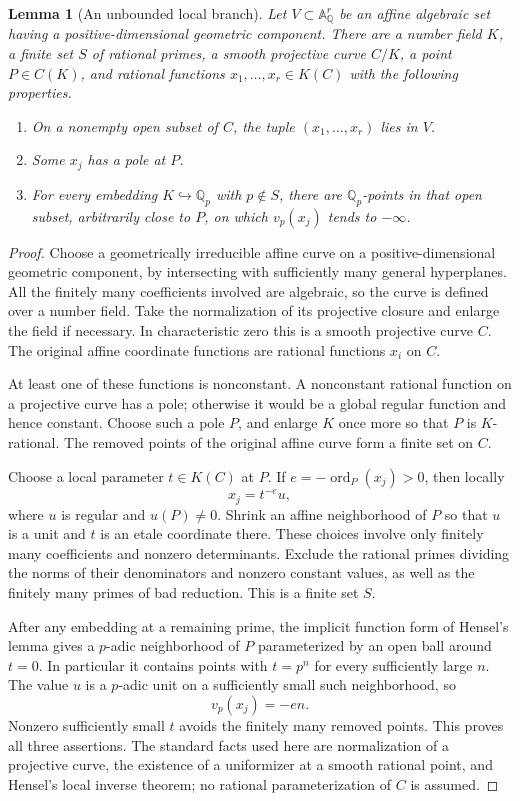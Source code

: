\documentclass[11pt]{article}
\newtheorem{lemma}[theorem]{Lemma}
\newcommand{\Q}{\mathbb Q}\newcommand{\Z}{\mathbb Z}
\begin{document}
\begin{lemma}[An unbounded local branch]\label{branch}
Let $V\subset\mathbb A^r_{\Q}$ be an affine algebraic set having a
positive-dimensional geometric component. There are a number field $K$,
a finite set $S$ of rational primes, a smooth projective curve $C/K$,
a point $P\in C(K)$, and rational functions $x_1,\ldots,x_r\in K(C)$
with the following properties.
\begin{enumerate}
\item On a nonempty open subset of $C$, the tuple $(x_1,\ldots,x_r)$ lies
in $V$.
\item Some $x_j$ has a pole at $P$.
\item For every embedding $K\hookrightarrow\Q_p$ with $p\notin S$,
there are $\Q_p$-points in that open subset, arbitrarily close to $P$,
on which $v_p(x_j)$ tends to $-\infty$.
\end{enumerate}
\end{lemma}
\begin{proof}
Choose a geometrically irreducible affine curve on a positive-dimensional
geometric component,
by intersecting with sufficiently many general hyperplanes. All the
finitely many coefficients involved are algebraic, so the curve is
defined over a number field. Take the normalization of its projective
closure and enlarge the field if necessary. In characteristic zero this
is a smooth projective curve $C$. The original affine coordinate functions
are rational functions $x_i$ on $C$.

At least one of these functions is nonconstant. A nonconstant rational
function on a projective curve has a pole; otherwise it would be a global
regular function and hence constant. Choose such a pole $P$, and enlarge
$K$ once more so that $P$ is $K$-rational. The removed points of the
original affine curve form a finite set on $C$.

Choose a local parameter $t\in K(C)$ at $P$. If $e=-\operatorname{ord}_P(x_j)>0$,
then locally
\[
                         x_j=t^{-e}u,
\]
where $u$ is regular and $u(P)\ne0$. Shrink an affine neighborhood of $P$
so that $u$ is a unit and $t$ is an etale coordinate there. These choices
involve only finitely many coefficients and nonzero determinants. Exclude
the rational primes dividing the norms of their denominators and nonzero
constant values, as well as the finitely many primes of bad reduction. This is a finite set $S$.

After any embedding at a remaining prime, the implicit function form of
Hensel's lemma gives a $p$-adic neighborhood of $P$ parameterized by an
open ball around $t=0$. In particular it contains points with $t=p^n$
for every sufficiently large $n$. The value $u$ is a $p$-adic unit on a
sufficiently small such neighborhood, so
\[
                         v_p(x_j)=-en.
\]
Nonzero sufficiently small $t$ avoids the finitely many removed points.
This proves all three assertions. The standard facts used here are
normalization of a projective curve, the existence of a uniformizer at a
smooth rational point, and Hensel's local inverse theorem; no rational
parameterization of $C$ is assumed.
\end{proof}
\end{document}
